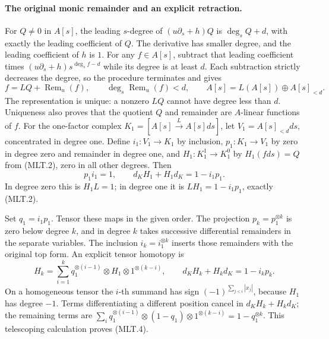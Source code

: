 \paragraph{The original monic remainder and an explicit retraction.}
For \(Q\ne0\) in \(A[s]\), the leading \(s\)-degree of
\((u\partial_s+h)Q\) is \(\deg_sQ+d\), with exactly the
leading coefficient of \(Q\). The derivative has smaller
degree, and the leading coefficient of \(h\) is \(1\).
For any \(f\in A[s]\), subtract that leading coefficient
times \((u\partial_s+h)s^{\deg_s f-d}\) while its degree
is at least \(d\). Each subtraction strictly decreases
the degree, so the procedure terminates and gives
\[
 f=LQ+\operatorname{Rem}_u(f),\qquad
 \deg_s\operatorname{Rem}_u(f)<d,\qquad
 A[s]=L(A[s])\oplus A[s]_{<d}.                            \tag{MLT.2}
\]
The representation is unique: a nonzero \(LQ\) cannot
have degree less than \(d\). Uniqueness also proves
that the quotient \(Q\) and remainder are \(A\)-linear
functions of \(f\).
For the one-factor complex \(K_1=[A[s]\xrightarrow{L}A[s]ds]\),
let \(V_1=A[s]_{<d}ds\), concentrated in degree one.
Define \(i_1:V_1\to K_1\) by inclusion,
\(p_1:K_1\to V_1\) by zero in degree zero and remainder
in degree one, and \(H_1:K_1^1\to K_1^0\) by
\(H_1(fds)=Q\) from (MLT.2), zero in all other degrees.
Then
\[
 p_1i_1=1,\qquad
 d_KH_1+H_1d_K=1-i_1p_1.                                 \tag{MLT.3}
\]
In degree zero this is \(H_1L=1\); in degree one it
is \(LH_1=1-i_1p_1\), exactly (MLT.2).

Set \(q_1=i_1p_1\). Tensor these maps in the given order.
The projection \(p_k=p_1^{\otimes k}\) is zero below
degree \(k\), and in degree \(k\) takes successive
differential remainders in the separate variables.
The inclusion \(i_k=i_1^{\otimes k}\) inserts those
remainders with the original top form. An explicit
tensor homotopy is
\[
 H_k=\sum_{i=1}^k q_1^{\otimes(i-1)}\otimes H_1
                        \otimes 1^{\otimes(k-i)},\qquad
 d_KH_k+H_kd_K=1-i_kp_k.                                 \tag{MLT.4}
\]
On a homogeneous tensor the \(i\)-th summand has sign
\((-1)^{\sum_{j<i}|x_j|}\), because \(H_1\) has degree
\(-1\). Terms differentiating a different position
cancel in \(d_KH_k+H_kd_K\); the remaining terms are
\(\sum_i q_1^{\otimes(i-1)}\otimes(1-q_1)
\otimes1^{\otimes(k-i)}=1-q_1^{\otimes k}\).
This telescoping calculation proves (MLT.4).

